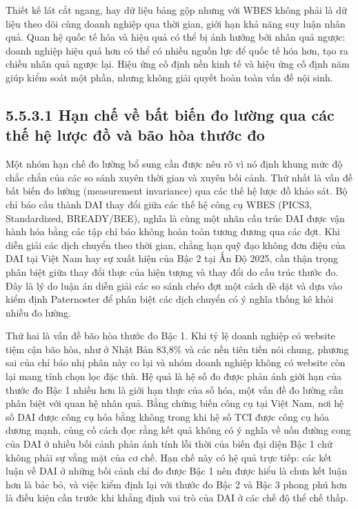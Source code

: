 \documentclass[
  a4paper,
  13pt]{extreport}
\begin{document}
Thiết kế lát cắt ngang, hay dữ liệu bảng gộp nhưng với WBES không phải
là dữ liệu theo dõi cùng doanh nghiệp qua thời gian, giới hạn khả năng
suy luận nhân quả. Quan hệ quốc tế hóa và hiệu quả có thể bị ảnh hưởng
bởi nhân quả ngược: doanh nghiệp hiệu quả hơn có thể có nhiều nguồn lực
để quốc tế hóa hơn, tạo ra chiều nhân quả ngược lại. Hiệu ứng cố định
nền kinh tế và hiệu ứng cố định năm giúp kiểm soát một phần, nhưng không
giải quyết hoàn toàn vấn đề nội sinh.

\hypertarget{hux1ea1n-chux1ebf-vux1ec1-bux1ea5t-biux1ebfn-ux111o-lux1b0ux1eddng-qua-cuxe1c-thux1ebf-hux1ec7-lux1b0ux1ee3c-ux111ux1ed3-vuxe0-buxe3o-huxf2a-thux1b0ux1edbc-ux111o}{%
\subsection{5.5.3.1 Hạn chế về bất biến đo lường qua các thế hệ lược đồ
và bão hòa thước
đo}\label{hux1ea1n-chux1ebf-vux1ec1-bux1ea5t-biux1ebfn-ux111o-lux1b0ux1eddng-qua-cuxe1c-thux1ebf-hux1ec7-lux1b0ux1ee3c-ux111ux1ed3-vuxe0-buxe3o-huxf2a-thux1b0ux1edbc-ux111o}}

Một nhóm hạn chế đo lường bổ sung cần được nêu rõ vì nó định khung mức
độ chắc chắn của các so sánh xuyên thời gian và xuyên bối cảnh. Thứ nhất
là vấn đề bất biến đo lường (measurement invariance) qua các thế hệ lược
đồ khảo sát. Bộ chỉ báo cấu thành DAI thay đổi giữa các thế hệ công cụ
WBES (PICS3, Standardized, BREADY/BEE), nghĩa là cùng một nhãn cấu trúc
DAI được vận hành hóa bằng các tập chỉ báo không hoàn toàn tương đương
qua các đợt. Khi diễn giải các dịch chuyển theo thời gian, chẳng hạn quỹ
đạo không đơn điệu của DAI tại Việt Nam hay sự xuất hiện của Bậc 2 tại
Ấn Độ 2025, cần thận trọng phân biệt giữa thay đổi thực của hiện tượng
và thay đổi do cấu trúc thước đo. Đây là lý do luận án diễn giải các so
sánh chéo đợt một cách dè dặt và dựa vào kiểm định Paternoster để phân
biệt các dịch chuyển có ý nghĩa thống kê khỏi nhiễu đo lường.

Thứ hai là vấn đề bão hòa thước đo Bậc 1. Khi tỷ lệ doanh nghiệp có
website tiệm cận bão hòa, như ở Nhật Bản 83,8\% và các nền tiên tiến nói
chung, phương sai của chỉ báo nhị phân này co lại và nhóm doanh nghiệp
không có website còn lại mang tính chọn lọc đặc thù. Hệ quả là hệ số đo
được phản ánh giới hạn của thước đo Bậc 1 nhiều hơn là giới hạn thực của
số hóa, một vấn đề đo lường cần phân biệt với quan hệ nhân quả. Bằng
chứng biến công cụ tại Việt Nam, nơi hệ số DAI được công cụ hóa bằng
không trong khi hệ số TCI được công cụ hóa dương mạnh, củng cố cách đọc
rằng kết quả không có ý nghĩa về uốn đường cong của DAI ở nhiều bối cảnh
phản ánh tính lỗi thời của biến đại diện Bậc 1 chứ không phải sự vắng
mặt của cơ chế. Hạn chế này có hệ quả trực tiếp: các kết luận về DAI ở
những bối cảnh chỉ đo được Bậc 1 nên được hiểu là chưa kết luận hơn là
bác bỏ, và việc kiểm định lại với thước đo Bậc 2 và Bậc 3 phong phú hơn
là điều kiện cần trước khi khẳng định vai trò của DAI ở các chế độ thể
chế thấp.
\end{document}

